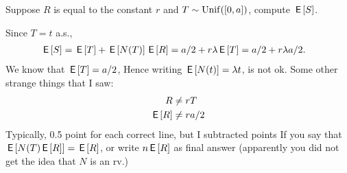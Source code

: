 \begin{exercise}[2]
  Suppose $R$ is equal to the constant $r$ and $T\sim\mathrm{Unif}([0, a])$, compute $\,\mathsf{E}\left[S\right]$.
\begin{solution}
    Since $T=t$ a.s.,
    \begin{align*}
      \,\mathsf{E}\left[S\right] &= \,\mathsf{E}\left[T\right]  + \,\mathsf{E}\left[N(T)\right]\,\mathsf{E}\left[R\right]= a/2+ r \lambda \,\mathsf{E}\left[T\right] = a/2 + r \lambda a/2.
    \end{align*}
We know that $\,\mathsf{E}\left[T\right] = a/2$, Hence writing $\,\mathsf{E}\left[N(t)\right] = \lambda t$, is not ok. Some other strange things that I saw:
\begin{align}
  \label{}
 R &\neq r T\\
\,\mathsf{E}\left[R\right] &\neq ra/2\\
\end{align}
Typically, 0.5 point for each correct line, but I subtracted points If you say that $\,\mathsf{E}\left[N(T) \,\mathsf{E}\left[R\right]\right] = \,\mathsf{E}\left[R\right]$, or write $n\,\mathsf{E}\left[R\right]$ as final answer (apparently you did not get the idea that $N$ is an rv.)
\end{solution}
\end{exercise}


